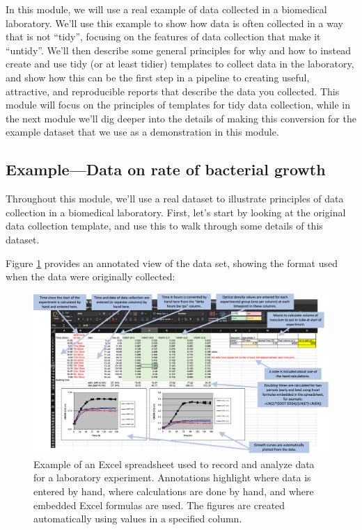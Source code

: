 \documentclass[]{tufte-book}
\begin{document}
In this module, we will use a real example of data collected in a biomedical laboratory.
We'll use this example to show how data is often collected in a way that is
not ``tidy'', focusing on the features of data collection that make it ``untidy''.
We'll then describe some general principles for why and how to instead create and
use tidy (or at least tidier) templates to collect data in the laboratory, and
show how this can be the first step in a pipeline to creating useful, attractive,
and reproducible reports that describe the data you collected. This module will
focus on the principles of templates for tidy data collection, while in the next
module we'll dig deeper into the details of making this conversion for the
example dataset that we use as a demonstration in this module.

\hypertarget{exampledata-on-rate-of-bacterial-growth}{%
\subsection{Example---Data on rate of bacterial growth}\label{exampledata-on-rate-of-bacterial-growth}}

Throughout this module, we'll use a real dataset to illustrate principles of
data collection in a biomedical laboratory. First, let's start by looking at the
original data collection template, and use this to walk through some details of
this dataset.

Figure \ref{fig:growthexcel1} provides an annotated view of the data set, showing
the format used when the data were originally collected:

\begin{figure}
\includegraphics[width=\textwidth]{figures/growth_curve_example} \caption[Example of an Excel spreadsheet used to record and analyze data for a laboratory experiment]{Example of an Excel spreadsheet used to record and analyze data for a laboratory experiment. Annotations highlight where data is entered by hand, where calculations are done by hand, and where embedded Excel formulas are used. The figures are created automatically using values in a specified column.}\label{fig:growthexcel1}
\end{figure}
\end{document}
